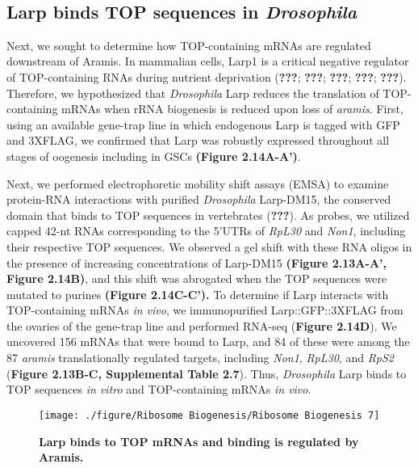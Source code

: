 \documentclass[12pt,oneside]{reedthesis}
\begin{document}
\textbf{\\
}

\hypertarget{larp-binds-top-sequences-in-drosophila}{%
\subsection{\texorpdfstring{Larp binds TOP sequences in \emph{Drosophila}}{Larp binds TOP sequences in Drosophila}}\label{larp-binds-top-sequences-in-drosophila}}

Next, we sought to determine how TOP-containing mRNAs are regulated downstream of Aramis. In mammalian cells, Larp1 is a critical negative regulator of TOP-containing RNAs during nutrient deprivation ({\textbf{???}}; {\textbf{???}}; {\textbf{???}}; {\textbf{???}}; {\textbf{???}}). Therefore, we hypothesized that \emph{Drosophila} Larp reduces the translation of TOP-containing mRNAs when rRNA biogenesis is reduced upon loss of \emph{aramis}. First, using an available gene-trap line in which endogenous Larp is tagged with GFP and 3XFLAG, we confirmed that Larp was robustly expressed throughout all stages of oogenesis including in GSCs \textbf{(Figure 2.14A-A')}.

Next, we performed electrophoretic mobility shift assays (EMSA) to examine protein-RNA interactions with purified \emph{Drosophila} Larp-DM15, the conserved domain that binds to TOP sequences in vertebrates ({\textbf{???}}). As probes, we utilized capped 42-nt RNAs corresponding to the 5'UTRs of \emph{RpL30} and \emph{Non1}, including their respective TOP sequences. We observed a gel shift with these RNA oligos in the presence of increasing concentrations of Larp-DM15 \textbf{(Figure 2.13A-A', Figure 2.14B)}, and this shift was abrogated when the TOP sequences were mutated to purines \textbf{(Figure 2.14C-C').} To determine if Larp interacts with TOP-containing mRNAs \emph{in vivo}, we immunopurified Larp::GFP::3XFLAG from the ovaries of the gene-trap line and performed RNA-seq (\textbf{Figure 2.14D}). We uncovered 156 mRNAs that were bound to Larp, and 84 of these were among the 87 \emph{aramis} translationally regulated targets, including \emph{Non1}, \emph{RpL30}, and \emph{RpS2} (\textbf{Figure 2.13B-C, Supplemental Table 2.7}). Thus, \emph{Drosophila} Larp binds to TOP sequences \emph{in vitro} and TOP-containing mRNAs \emph{in vivo}.
\begin{figure}

{\centering \texttt{[image: ./figure/Ribosome Biogenesis/Ribosome Biogenesis 7]} 

}

\caption[\textbf{Larp binds to TOP mRNAs and binding is regulated by Aramis.}]{\textbf{Larp binds to TOP mRNAs and binding is regulated by Aramis.}}\label{fig:unnamed-chunk-18}
\end{figure}
\end{document}
